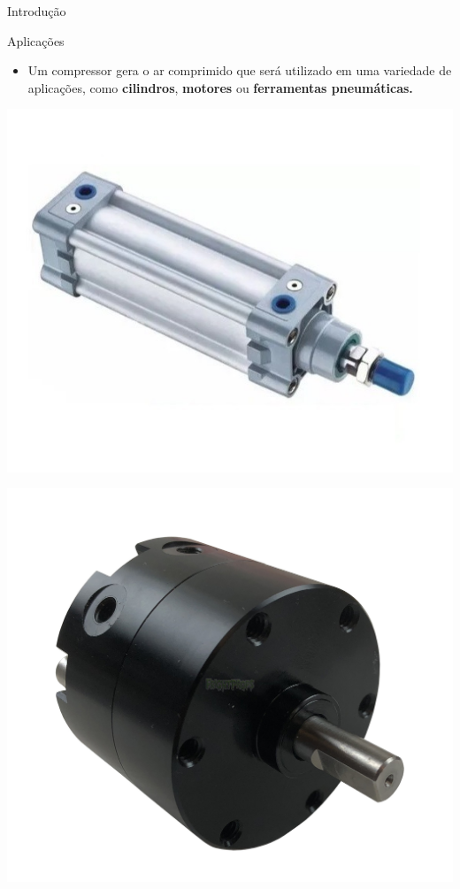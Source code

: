 \begin{frame}{Introdução}
	\begin{block}{Aplicações}
		\begin{itemize}
			\item Um compressor gera o ar comprimido que será utilizado em uma variedade de aplicações, como \textbf{cilindros}, \textbf{motores} ou \textbf{ferramentas pneumáticas.}
		\end{itemize}
	\end{block}
	
	\begin{minipage}{0.45\linewidth}
		\centering
		\includegraphics[width=1\linewidth]{Figuras/Ch11/fig2n1}
	\end{minipage}
	\hfill
	\begin{minipage}{0.45\linewidth}
		\centering
		\includegraphics[width=1\linewidth]{Figuras/Ch11/fig2n2}
	\end{minipage}
	
\end{frame}


